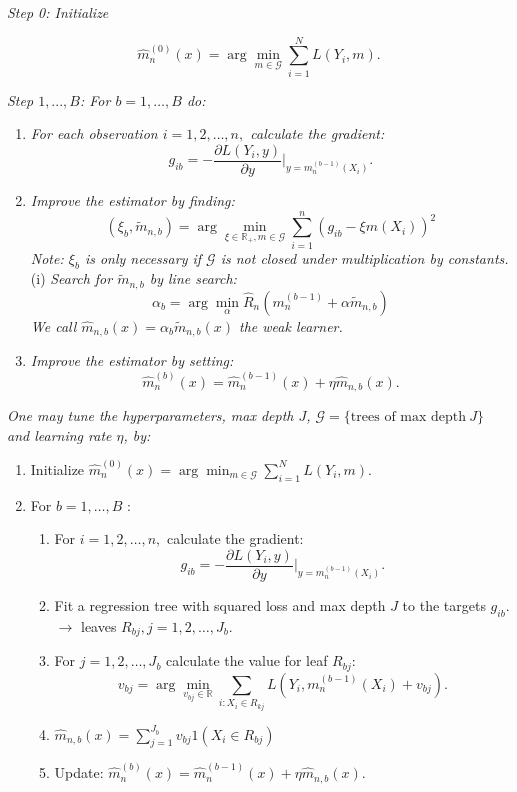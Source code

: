 \documentclass[a4paper,10pt,openany]{book}
\providecommand{\tightlist}{%
 \setlength{\itemsep}{0pt}\setlength{\parskip}{0pt}}
\begin{document}
\emph{Step 0: Initialize}

\[
\hat m_{n}^{(0)}(x)=\arg \min_{m \in \mathcal G} \sum_{i=1}^N L\left(Y_i, m\right).
\]

\emph{Step \(1,..., B\): For \(b=1,\dots,B\) do:}

\begin{enumerate}
\def\labelenumi{(\alph{enumi})}
\tightlist
\item
  \emph{For each observation \(i=1,2, \ldots, n,\) calculate the gradient:}
  \[g_{ib}=-\frac{\partial L(Y_i,y)}{\partial y} \Bigr\rvert_{y=m_n^{(b-1)}(X_i)}.\]
\item
  \emph{Improve the estimator by finding:}
  \[(\xi_b, \tilde m_{n,b})= \arg \min_{\xi\in \mathbb R_+,m \in \mathcal G}\sum_{i=1}^n(g_{ib}-\xi m(X_i))^2\]
  \emph{Note: \(\xi_b\) is only necessary if \(\mathcal G\) is not closed under multiplication by constants.}
  (i) \emph{Search for \(\tilde m_{n,b}\) by line search:}
  \[\alpha_b= \arg \min_{\alpha} \hat R_n(m_n^{(b-1)}+\alpha \tilde  m_{n,b})\]
  \emph{We call \(\hat m_{n,b}(x)= \alpha_b \tilde m_{n,b}(x)\) the weak learner.}
\item
  \emph{Improve the estimator by setting:}
  \[\hat m^{(b)}_n(x)=\hat m^{(b-1)}_n(x)+\eta \hat m_{n,b}(x).\]
\end{enumerate}

\emph{One may tune the hyperparameters, max depth \(J\), \(\mathcal G=\{\text{trees of max depth} \ J\}\) and learning rate \(\eta\), by:}

\begin{enumerate}
\def\labelenumi{\arabic{enumi}.}
\tightlist
\item
  Initialize \(\hat m_{n}^{(0)}(x)=\arg \min_{m \in \mathcal G} \sum_{i=1}^N L\left(Y_i, m\right)\).
\item
  For \(b=1,\dots,B\) :

  \begin{enumerate}
  \def\labelenumii{(\alph{enumii})}
  \tightlist
  \item
    For \(i=1,2, \ldots, n,\) calculate the gradient:
    \[
    g_{ib}=-\frac{\partial L(Y_i,y)}{\partial y} \Bigr\rvert_{y=m_n^{(b-1)}(X_i)} .
    \]
  \item
    Fit a regression tree with squared loss and max depth \(J\) to the targets \(g_{ib}\). \(\rightarrow\) leaves \(R_{bj}, j=1,2, \ldots, J_b\).
  \item
    For \(j=1,2, \ldots, J_b\) calculate the value for leaf \(R_{bj}\):
    \[
    v_{bj}=\arg \min_{ v_{bj} \in \mathbb R} \sum_{i: X_i \in R_{kj}} L\left(Y_i, m_n^{(b-1)}(X_i)+ v_{bj}\right) .
    \]
  \item
    \(\hat m_{n,b}(x)=\sum_{j=1}^{J_b} v_{bj} 1\left(X_i \in R_{b j}\right)\)
  \item
    Update: \(\hat m^{(b)}_n(x)=\hat m^{(b-1)}_n(x)+ \eta \hat m_{n,b}(x)\).
  \end{enumerate}
\end{enumerate}
\end{document}
